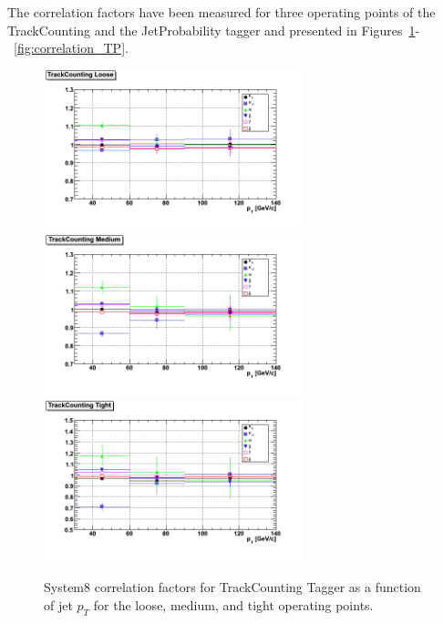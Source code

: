 The correlation factors have been measured for three operating points of the 
TrackCounting and the JetProbability tagger and presented in 
Figures~\ref{fig:correlation_TC}-~\ref{fig:correlation_TP}.


\begin{figure}[htbp]
  \begin{center}
    \includegraphics[width=75mm]{Figures/TCL_correlations_ppmux.png}
    \includegraphics[width=75mm]{Figures/TCM_correlations_ppmux.png}
    \includegraphics[width=75mm]{Figures/TCT_correlations_ppmux.png}
  \end{center}
  \caption{System8 correlation factors for TrackCounting Tagger as a function
of jet $p_T $ for the loose, medium, and tight operating points.}
  \label{fig:correlation_TC}
\end{figure}

